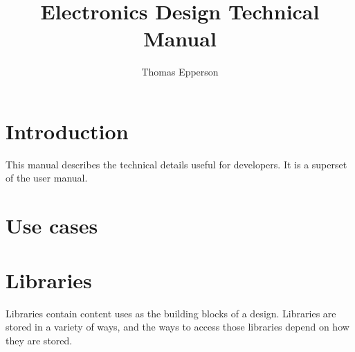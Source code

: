 \documentclass[letterpaper,12pt,twoside]{book}
\begin{document}
\title{Electronics Design Technical Manual}
\author{Thomas Epperson}
\maketitle
\newpage
\tableofcontents
\newpage

\chapter {Introduction}
This manual describes the technical details useful for developers. It is a superset of the user manual.

\chapter {Use cases}

\chapter {Libraries}
Libraries contain content uses as the building blocks of a design. Libraries are stored in a variety of ways, and the ways to access those libraries depend on how they are stored.
\end{document}
